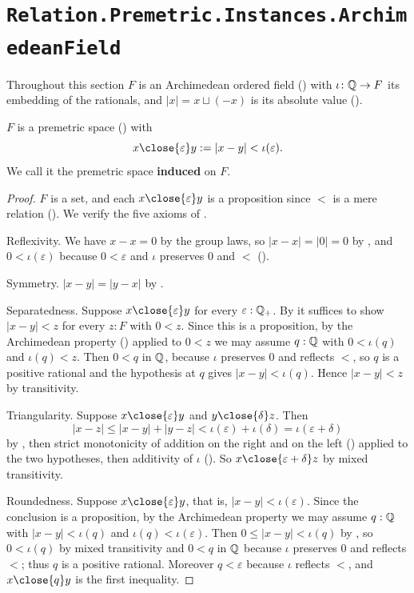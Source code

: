 \section{\texttt{Relation.Premetric.Instances.ArchimedeanField}}

Throughout this section $F$ is an Archimedean ordered field () with $\iota \colon \mathbb{Q} \to F$ its embedding of the rationals, and $\lvert x \rvert = x \sqcup (-x)$ is its absolute value ().

\begin{definition}
  \label{inducedPremetricSpace}
  $F$ is a premetric space () with
  \[
    x \close{\varepsilon} y := \lvert x - y \rvert < \iota(\varepsilon).
  \]
  We call it the premetric space \textbf{induced} on $F$.
\end{definition}
\begin{proof}
  $F$ is a set, and each $x \close{\varepsilon} y$ is a proposition since $<$ is a mere relation (). We verify the five axioms of .

  Reflexivity. We have $x - x = 0$ by the group laws, so $\lvert x - x \rvert = \lvert 0 \rvert = 0$ by , and $0 < \iota(\varepsilon)$ because $0 < \varepsilon$ and $\iota$ preserves $0$ and $<$ ().

  Symmetry. $\lvert x - y \rvert = \lvert y - x \rvert$ by .

  Separatedness. Suppose $x \close{\varepsilon} y$ for every $\varepsilon : \mathbb{Q}_{+}$. By  it suffices to show $\lvert x - y \rvert < z$ for every $z : F$ with $0 < z$. Since this is a proposition, by the Archimedean property () applied to $0 < z$ we may assume $q : \mathbb{Q}$ with $0 < \iota(q)$ and $\iota(q) < z$. Then $0 < q$ in $\mathbb{Q}$, because $\iota$ preserves $0$ and reflects $<$, so $q$ is a positive rational and the hypothesis at $q$ gives $\lvert x - y \rvert < \iota(q)$. Hence $\lvert x - y \rvert < z$ by transitivity.

  Triangularity. Suppose $x \close{\varepsilon} y$ and $y \close{\delta} z$. Then
  \[
    \lvert x - z \rvert \le \lvert x - y \rvert + \lvert y - z \rvert < \iota(\varepsilon) + \iota(\delta) = \iota(\varepsilon + \delta)
  \]
  by , then strict monotonicity of addition on the right and on the left () applied to the two hypotheses, then additivity of $\iota$ (). So $x \close{\varepsilon + \delta} z$ by mixed transitivity.

  Roundedness. Suppose $x \close{\varepsilon} y$, that is, $\lvert x - y \rvert < \iota(\varepsilon)$. Since the conclusion is a proposition, by the Archimedean property we may assume $q : \mathbb{Q}$ with $\lvert x - y \rvert < \iota(q)$ and $\iota(q) < \iota(\varepsilon)$. Then $0 \le \lvert x - y \rvert < \iota(q)$ by , so $0 < \iota(q)$ by mixed transitivity and $0 < q$ in $\mathbb{Q}$ because $\iota$ preserves $0$ and reflects $<$; thus $q$ is a positive rational. Moreover $q < \varepsilon$ because $\iota$ reflects $<$, and $x \close{q} y$ is the first inequality.
\end{proof}

